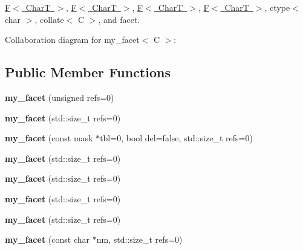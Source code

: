 \mbox{\hyperlink{struct_f}{F$<$ Char\+T $>$}}, \mbox{\hyperlink{struct_f}{F$<$ Char\+T $>$}}, \mbox{\hyperlink{struct_f}{F$<$ Char\+T $>$}}, \mbox{\hyperlink{struct_f}{F$<$ Char\+T $>$}}, ctype$<$ char $>$, collate$<$ C $>$, and facet.



Collaboration diagram for my\+\_\+facet$<$ C $>$\+:
\subsection*{Public Member Functions}
\begin{DoxyCompactItemize}
\item 
\mbox{\label{structmy__facet_a04da9ed698756d68aefaeb4cfd9f49ce}} 
{\bfseries my\+\_\+facet} (unsigned refs=0)
\item 
\mbox{\label{structmy__facet_aff29b1cbf5e107557c0f3763905c67c0}} 
{\bfseries my\+\_\+facet} (std\+::size\+\_\+t refs=0)
\item 
\mbox{\label{structmy__facet_ae1c0a2301ce0b760add84d87d3e868d5}} 
{\bfseries my\+\_\+facet} (const mask $\ast$tbl=0, bool del=false, std\+::size\+\_\+t refs=0)
\item 
\mbox{\label{structmy__facet_aff29b1cbf5e107557c0f3763905c67c0}} 
{\bfseries my\+\_\+facet} (std\+::size\+\_\+t refs=0)
\item 
\mbox{\label{structmy__facet_aff29b1cbf5e107557c0f3763905c67c0}} 
{\bfseries my\+\_\+facet} (std\+::size\+\_\+t refs=0)
\item 
\mbox{\label{structmy__facet_aff29b1cbf5e107557c0f3763905c67c0}} 
{\bfseries my\+\_\+facet} (std\+::size\+\_\+t refs=0)
\item 
\mbox{\label{structmy__facet_aff29b1cbf5e107557c0f3763905c67c0}} 
{\bfseries my\+\_\+facet} (std\+::size\+\_\+t refs=0)
\item 
\mbox{\label{structmy__facet_a8a7e169031980ff202f6efe4d7e24ddb}} 
{\bfseries my\+\_\+facet} (const char $\ast$nm, std\+::size\+\_\+t refs=0)
\item 
\mbox{\label{structmy__facet_a6729ecd86319119e683a0c214f4c49ed}} 

\end{DoxyCompactItemize}

